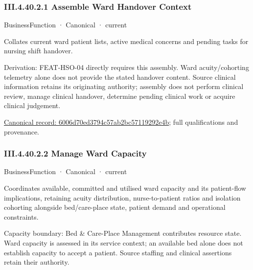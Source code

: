 \subsubsection*{III.4.40.2.1 Assemble Ward Handover Context}
\label{navigation:III.4.40.2.1}

\label{element:6006d70ed3794c57ab2bc57119292e4b}
{\small BusinessFunction · Canonical · current}\par

Collates current ward patient lists, active medical concerns and pending tasks for nursing shift handover.



Derivation: FEAT-HSO-04 directly requires this assembly. Ward acuity/cohorting telemetry alone does not provide the stated handover content. Source clinical information retains its originating authority; assembly does not perform clinical review, manage clinical handover, determine pending clinical work or acquire clinical judgement.


{\footnotesize \href{../../../../continuum/business/business-function/6006d70ed3794c57ab2bc57119292e4b.md}{Canonical record: 6006d70ed3794c57ab2bc57119292e4b}; full qualifications and provenance.}\par
\subsubsection*{III.4.40.2.2 Manage Ward Capacity}
\label{navigation:III.4.40.2.2}

\label{element:eca5f4fbf92743f987a01930dc4ee763}
{\small BusinessFunction · Canonical · current}\par

Coordinates available, committed and utilised ward capacity and its patient-flow implications, retaining acuity distribution, nurse-to-patient ratios and isolation cohorting alongside bed/care-place state, patient demand and operational constraints.



Capacity boundary: Bed \& Care-Place Management contributes resource state. Ward capacity is assessed in its service context; an available bed alone does not establish capacity to accept a patient. Source staffing and clinical assertions retain their authority.


